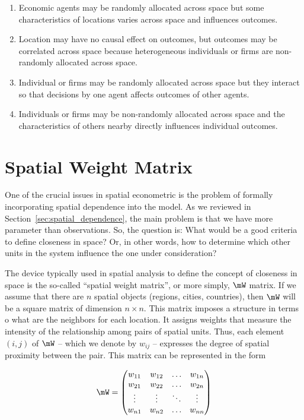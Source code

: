 \begin{enumerate}
	\item Economic agents may be randomly allocated across space but some characteristics of locations varies across space and influences outcomes. 
	\item Location may have no causal effect on outcomes, but outcomes may be correlated across space because heterogeneous individuals or firms are non-randomly allocated across space. 
	\item Individual or firms may be randomly allocated across  space but they interact so that decisions by one agent affects outcomes of other agents. 
	\item Individuals or firms may be non-randomly allocated across space and the characteristics of others nearby directly influences individual outcomes. 
\end{enumerate}


\section{Spatial Weight Matrix}

One of the crucial issues in spatial econometric is the problem of formally incorporating spatial dependence into the model. As we reviewed in Section~\ref{sec:spatial_dependence}, the main problem is that we have more parameter than observations. So, the question is: What would be a good criteria to define closeness in space? Or, in other words, how to determine which other units in the system influence the one under consideration?

The device typically used in spatial analysis to define the concept of closeness in space is the so-called ``spatial weight matrix'', or more simply, $\mW$ matrix. If we assume that there are $n$ spatial objects (regions, cities, countries), then $\mW$ will be a square matrix of dimension $n \times n$. This matrix imposes a structure in terms o what are the neighbors for each location. It assigns weights that measure the intensity of the relationship among pairs of spatial units. Thus, each element $(i,j)$ of $\mW$ -- which we denote by $w_{ij}$ -- expresses the degree of spatial proximity between the pair. This matrix can be represented in the form

\begin{equation*}
\mW = \begin{pmatrix}
        w_{11} & w_{12} & \hdots & w_{1n} \\ 
        w_{21} & w_{22} & \hdots & w_{2n} \\
        \vdots & \vdots & \ddots & \vdots \\
        w_{n1} & w_{n2} & \hdots & w_{nn} 
      \end{pmatrix}
\end{equation*}

